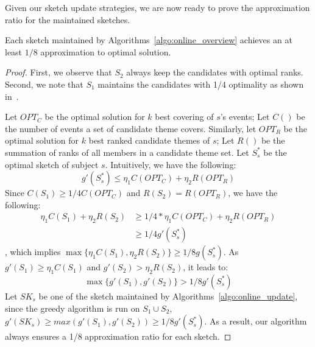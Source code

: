 
Given our sketch update strategies, we are now ready to prove the approximation ratio for the maintained sketches. 

\begin{theorem}
\label{thm:online_quality}
Each sketch maintained by Algorithms~\ref{algo:online_overview}
achieves an at least $1/8$ approximation to optimal solution.
\end{theorem}

\begin{proof}
First, we observe that $S_2$ always keep the candidates with optimal ranks. 
Second, we note that $S_1$ maintains the candidates with 1/4 optimality as shown in~\cite{Saha2009On}.

Let $OPT_C$ be the optimal solution for $k$ best covering of $s$'s events; Let $C()$ be the number of events a set of candidate theme covers. Similarly, let $OPT_R$ be the optimal solution for $k$ best ranked candidate themes of $s$; Let $R()$ be the 
summation of ranks of all members in a candidate theme set. Let $S^*_s$ be the optimal sketch of subject $s$. Intuitively, we have the following: 
\begin{equation*} 
g'(S^*_s) \leq \eta_1 C(OPT_C) + \eta_2 R(OPT_R)
\end{equation*}
Since $C(S_1) \geq 1/4 C(OPT_C)$ and $R(S_2) = R(OPT_R)$, we have the following:
\begin{equation*}
\begin{split}
\eta_1 C(S_1) + \eta_2 R(S_2) & \geq 1/4 * \eta_1 C(OPT_C) + \eta_2 R(OPT_R) \\
& \geq 1/4 g'(S^*_s)
\end{split}
\end{equation*}
, which implies $\max\{\eta_1 C(S_1), \eta_2 R(S_2)\} \geq 1/8 g( S^*_s)$. 
As $g'(S_1) \geq \eta_1 C(S_1)$ and $g'(S_2) > \eta_2 R(S_2)$, it leads to:
\begin{equation*}
\max\{g'(S_1), g'(S_2)\} > 1/8  g'(S^*_s)
\end{equation*}
Let $SK_s$ be one of the sketch maintained by Algorithms~\ref{algo:online_update},
since the greedy algorithm is run on $S_1 \cup S_2$, 
$g'(SK_s) \geq max(g'(S_1), g'(S_2)) \geq 1/8 g'(S^*_s)$.
As a result, our algorithm always ensures a 1/8 approximation ratio for each sketch.
\end{proof}

